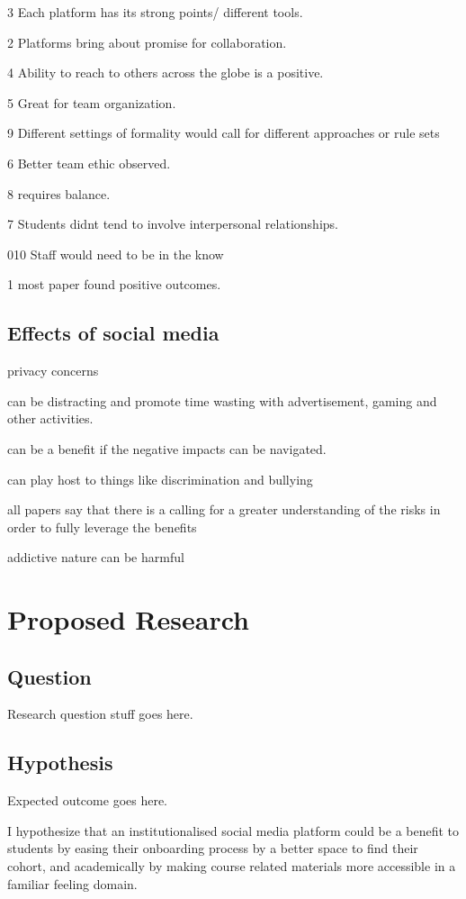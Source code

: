 \documentclass[lettersize,journal]{IEEEtran}
\begin{document}
	3	Each platform has its strong points/ different tools.

	2	Platforms bring about promise for collaboration.

	4	Ability to reach to others across the globe is a positive.

	5	Great for team organization.

	9	Different settings of formality would call for different approaches or rule sets

	6	Better team ethic observed.

	8	requires balance.

	7	Students didnt tend to involve interpersonal relationships.

	010	Staff would need to be in the know

	1	most paper found positive outcomes.
	\subsection{Effects of social media}

	privacy concerns
	
	can be distracting and promote time wasting with advertisement, gaming and other activities.

	can be a benefit if the negative impacts can be navigated.

	can play host to things like discrimination and bullying

	all papers say that there is a calling for a greater understanding of the risks in order to fully leverage the benefits

	addictive nature can be harmful

\section{Proposed Research}
	\subsection{Question}
	Research question stuff goes here.

	\subsection{Hypothesis}
	Expected outcome goes here.

	 I hypothesize that an institutionalised social media platform
	could be a benefit to students by easing their onboarding process by a better space to find their cohort,
	and academically by making course related materials more accessible in a familiar feeling domain. 
\end{document}

